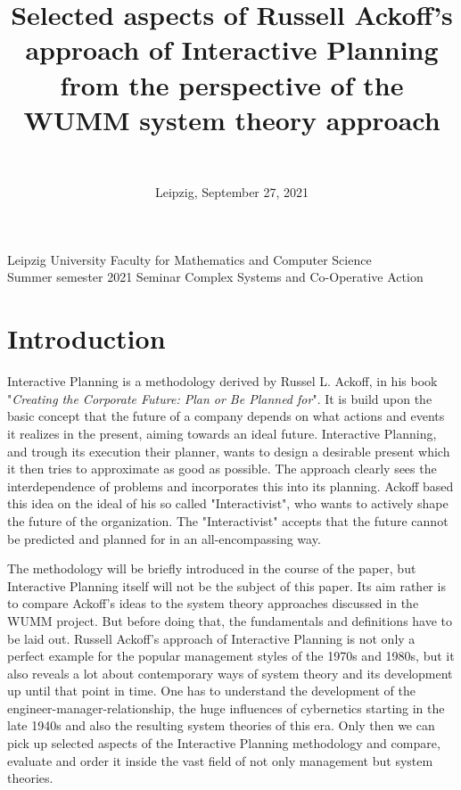 \documentclass[a4paper,12pt]{scrartcl}
\title{{\LARGE Selected aspects of Russell Ackoff's approach of Interactive Planning from the perspective of the WUMM system theory approach}}
\author{\\\vspace{-0.4em}{\normalsize Daniel Werner} }
\date{{\normalsize Leipzig, September 27, 2021}}
\begin{document}
\maketitle
\bigskip

\vfill

\noindent 
Leipzig University \hfill Faculty for Mathematics and Computer Science \\
Summer semester 2021 \hfill Seminar Complex Systems and Co-Operative Action \\
\thispagestyle{empty}
\clearpage
{}

\tableofcontents
\newpage

\section{Introduction}

Interactive Planning is a methodology derived by Russel L. Ackoff, in his  book "\textit{Creating the Corporate Future: Plan or Be Planned for}"\cite{ackoff:1981}. It is build upon the basic concept that the future of a company depends on what actions and events it realizes in the present, aiming towards an ideal  future. Interactive Planning, and trough its execution their planner, wants to design a desirable present which it then tries to approximate as good as possible. The approach clearly sees the interdependence of problems and incorporates this into its planning.
Ackoff based this idea on the ideal of his so called "Interactivist", who wants to actively shape the future of the organization. The "Interactivist" accepts that the future cannot be predicted  and planned for in an all-encompassing way.\cite{ackoff:2001}

The methodology will be briefly introduced in the course of the paper, but Interactive Planning itself will not be the subject of this paper. Its aim rather is to compare Ackoff's ideas to the system theory approaches discussed in the WUMM project.\cite{wumm:2021} But before doing that, the fundamentals and definitions have to be laid out. Russell Ackoff's approach of Interactive Planning is not only a perfect example for the popular management styles of the 1970s and 1980s, but it also reveals a lot about contemporary ways of system theory and its development up until that point in time. One has to understand the development of the engineer-manager-relationship, the huge influences of cybernetics starting in the late 1940s and also the resulting system theories of this era.
Only then we can pick up selected aspects of the Interactive Planning methodology and compare, evaluate and order it inside the vast field of not only management but system theories.
\end{document}
